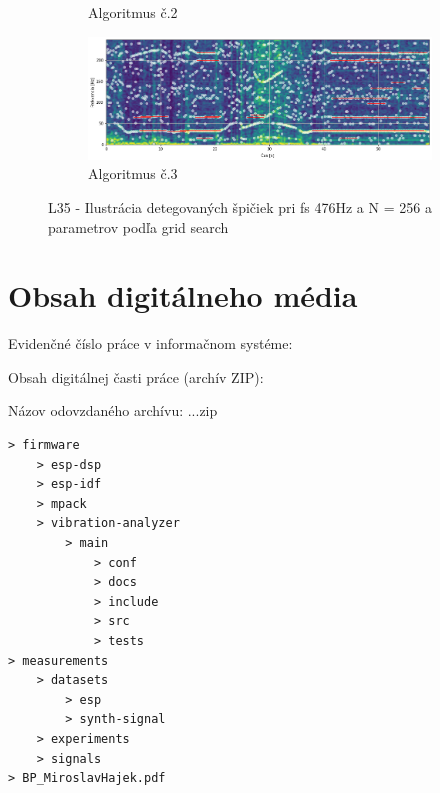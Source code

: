 \begin{figure}[h]
\begin{subfigure}{\textwidth}
        \caption{Algoritmus č.2}
     \end{subfigure}
      \begin{subfigure}{\textwidth}
    	\centering
        \includegraphics[width=\textwidth]{figures/verification/L35-dataset-A3.png}
        \caption{Algoritmus č.3}
     \end{subfigure}     
     \caption{L35 - Ilustrácia detegovaných špičiek pri fs 476Hz a N = 256 a parametrov podľa grid search}
\end{figure}

\chapter{Obsah digitálneho média}
\renewcommand*{\thepage}{E-\arabic{page}}
\par Evidenčné číslo práce v informačnom systéme: \RegNo
\par Obsah digitálnej časti práce (archív ZIP):
\par Názov odovzdaného archívu: ...zip
\begin{verbatim}
> firmware
	> esp-dsp
	> esp-idf
	> mpack
	> vibration-analyzer
		> main
			> conf
			> docs
			> include
			> src
			> tests
> measurements
	> datasets
		> esp
		> synth-signal
	> experiments
	> signals
> BP_MiroslavHajek.pdf
\end{verbatim}


